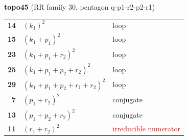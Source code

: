 \documentclass[10pt]{article}
\begin{document}
\begin{minipage}[t]{0.48\textwidth}
{}\\[2mm]\textbf{topo45} (RR family 30, pentagon q-p1-r2-p2-r1)\\[2pt]{\footnotesize\begin{tabular}{@{}r@{\ \ }l@{\ \ }l@{}}\textbf{14} & $(k_1)^2$ & loop\\
\textbf{15} & $(k_1+p_1)^2$ & loop\\
\textbf{23} & $(k_1+p_1+r_2)^2$ & loop\\
\textbf{25} & $(k_1+p_1+p_2+r_2)^2$ & loop\\
\textbf{29} & $(k_1+p_1+p_2+r_1+r_2)^2$ & loop\\
\textbf{7} & $(p_1+r_2)^2$ & conjugate\\
\textbf{13} & $(p_1+p_2+r_2)^2$ & conjugate\\
\textbf{11} & $(r_1+r_2)^2$ & \textcolor{red}{irreducible numerator}\\\end{tabular}}\end{minipage}\hfill%
\end{document}
